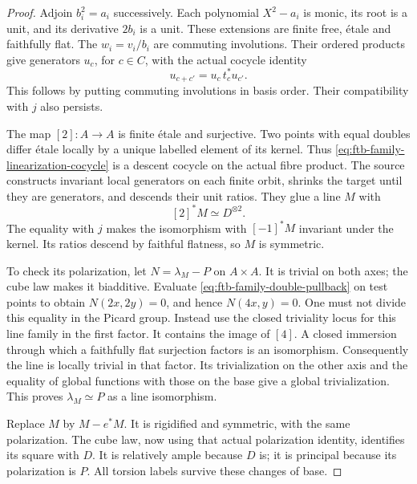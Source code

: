 \begin{proof}
Adjoin \(b_i^2=a_i\) successively.
Each polynomial \(X^2-a_i\) is monic, its root is a unit, and
its derivative \(2b_i\) is a unit.
These extensions are finite free, \'{e}tale and faithfully flat.
The \(w_i=v_i/b_i\) are commuting involutions.
Their ordered products give generators \(u_c\), for \(c\in C\),
with the actual cocycle identity
\[
                           u_{c+c'}=u_c\,t_c^*u_{c'}.
 \tag{F4}\label{eq:ftb-family-linearization-cocycle}
\]
This follows by putting commuting involutions in basis order.
Their compatibility with \(j\) also persists.

The map \([2]:A\to A\) is finite \'{e}tale and surjective.
Two points with equal doubles differ \'{e}tale locally by a
unique labelled element of its kernel.
Thus \eqref{eq:ftb-family-linearization-cocycle} is a descent
cocycle on the actual fibre product.
The source constructs invariant local generators on each finite
orbit, shrinks the target until they are generators, and
descends their unit ratios.
They glue a line \(M\) with
\[
                                [2]^*M\simeq D^{\otimes2}.
 \tag{F5}\label{eq:ftb-family-double-pullback}
\]
The equality with \(j\) makes the isomorphism with \([-1]^*M\)
invariant under the kernel.  Its ratios descend by faithful
flatness, so \(M\) is symmetric.

To check its polarization, let \(N=\lambda_M-P\) on \(A\times A\).
It is trivial on both axes; the cube law makes it biadditive.
Evaluate \eqref{eq:ftb-family-double-pullback} on test points
to obtain \(N(2x,2y)=0\), and hence \(N(4x,y)=0\).
One must not divide this equality in the Picard group.
Instead use the closed triviality locus for this line family
in the first factor.  It contains the image of \([4]\).
A closed immersion through which a faithfully flat surjection
factors is an isomorphism.
Consequently the line is locally trivial in that factor.
Its trivialization on the other axis and the equality of
global functions with those on the base give a global
trivialization.  This proves \(\lambda_M\simeq P\) as a line
isomorphism.

Replace \(M\) by \(M-e^*M\).
It is rigidified and symmetric, with the same polarization.
The cube law, now using that actual polarization identity,
identifies its square with \(D\).
It is relatively ample because \(D\) is; it is principal
because its polarization is \(P\).
All torsion labels survive these changes of base.
\end{proof}

